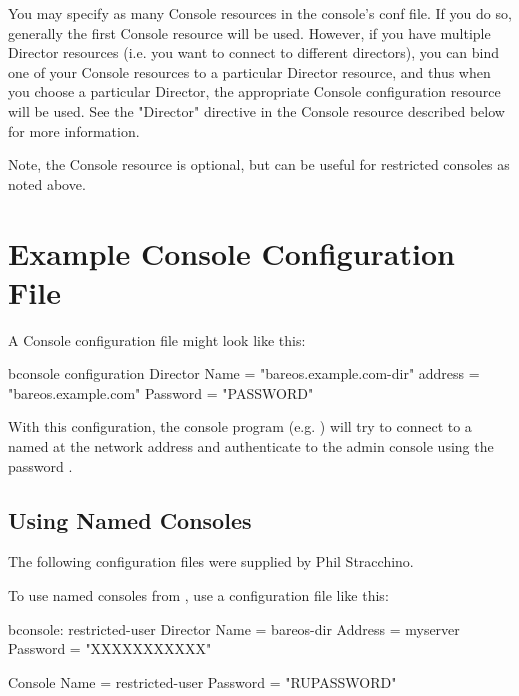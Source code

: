You may specify as many Console resources in the console's conf file. If
you do so, generally the first Console resource will be used.  However, if
you have multiple Director resources (i.e. you want to connect to different
directors), you can bind one of your Console resources to a particular
Director resource, and thus when you choose a particular Director, the
appropriate Console configuration resource will be used. See the "Director"
directive in the Console resource described below for more information.

Note, the Console resource is optional, but can be useful for
restricted consoles as noted above.





\section{Example Console Configuration File}

A Console configuration file might look like this:

\begin{bconfig}{bconsole configuration}
Director {
  Name = "bareos.example.com-dir"
  address = "bareos.example.com"
  Password = "PASSWORD"
}
\end{bconfig}

With this configuration, the console program (e.g. ) will try to connect
to a \bareosDir named 
at the network address  and authenticate to the admin console using the password .

\subsection{Using Named Consoles}
\label{sec:ConsoleAccessExample}
The following configuration files were supplied by Phil Stracchino.

To use named consoles from , use a  configuration file like this:
\begin{bconfig}{bconsole: restricted-user}
Director {
   Name = bareos-dir
   Address = myserver
   Password = "XXXXXXXXXXX"
}

Console {
   Name = restricted-user
   Password = "RUPASSWORD"
}
\end{bconfig}

